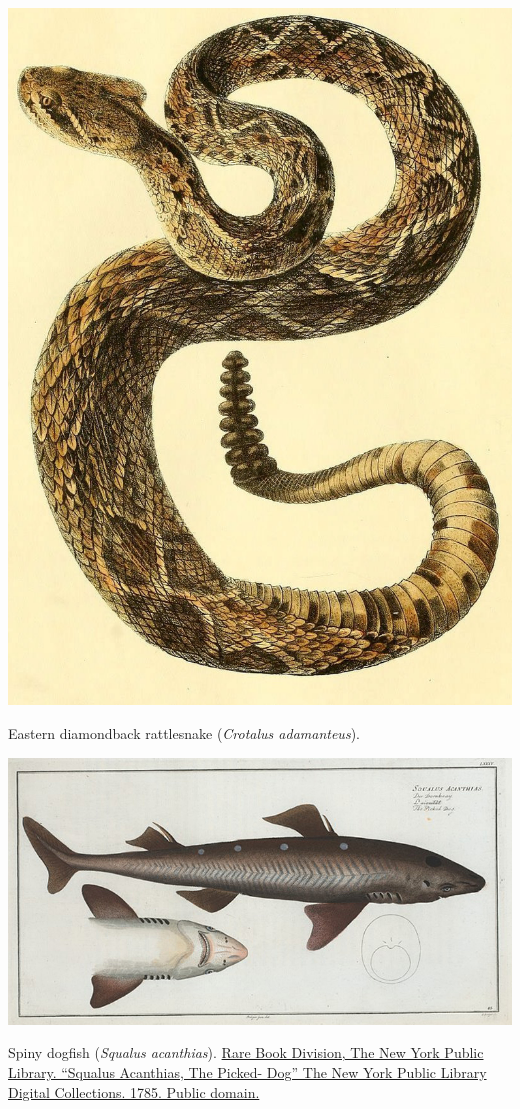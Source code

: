 \begin{marginfigure}
\begin{center}
\includegraphics[width= 0.7 \textwidth]{illustration_images/Genetic_drift/rattlesnake/rattlesnake.jpg}
\end{center}
\caption{Eastern diamondback rattlesnake ({\it Crotalus adamanteus}).  } \label{fig:rattlesnake}
\end{marginfigure}

\begin{marginfigure}
\begin{center}
\includegraphics[width= \textwidth]{illustration_images/Genetic_drift/dogfish/dogfish.jpg}
\end{center}
\caption{Spiny dogfish ({\it Squalus acanthias}). \newline \noindent \tiny{ \href{http://digitalcollections.nypl.org/items/510d47da-6930-a3d9-e040-e00a18064a99}{Rare Book Division, The New York Public Library. ``Squalus Acanthias, The Picked- Dog'' The New York Public Library Digital Collections. 1785. Public domain.}}}
\label{fig:dogfish}
\end{marginfigure}

